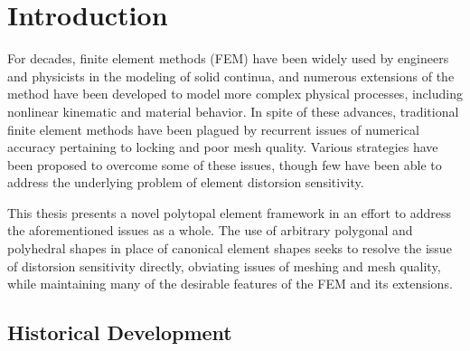 \chapter{Introduction}


	For decades, finite element methods (FEM) have been widely used by engineers and physicists in the modeling of solid continua, and numerous extensions of the method have been developed to model more complex physical processes, including nonlinear kinematic and material behavior.
	In spite of these advances, traditional finite element methods have been plagued by recurrent issues of numerical accuracy pertaining to locking and poor mesh quality. Various strategies have been proposed to overcome some of these issues, though few have been able to address the underlying problem of element distorsion sensitivity.
	
	This thesis presents a novel polytopal element framework in an effort to address the aforementioned issues as a whole. The use of arbitrary polygonal and polyhedral shapes in place of canonical element shapes seeks to resolve the issue of distorsion sensitivity directly, obviating issues of meshing and mesh quality, while maintaining many of the desirable features of the FEM and its extensions.

\section{Historical Development} %

